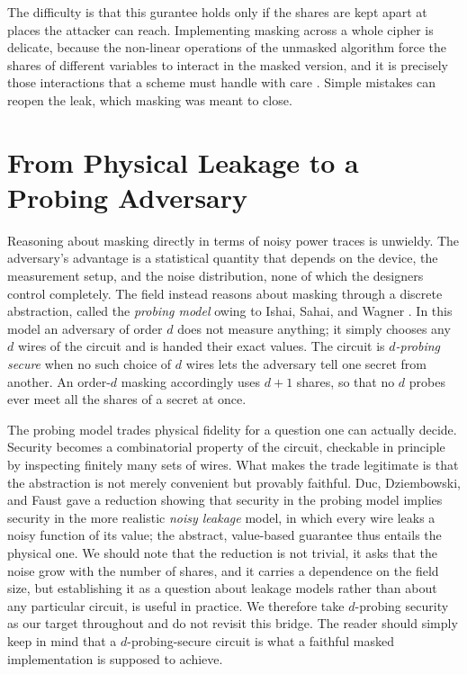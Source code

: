The difficulty is that this gurantee holds only if the shares are kept apart
at places the attacker can reach. Implementing masking across a whole cipher is
delicate, because the non-linear operations of the unmasked algorithm force the
shares of different variables to interact in the masked version, and it is precisely
those interactions that a scheme must handle with care \parencite{10.1007/978-3-540-45146-4_27,
rivain2010provably}. Simple mistakes can reopen the leak, which masking was meant to
close.

\section{From Physical Leakage to a Probing Adversary}
\label{sec:intro-model}

Reasoning about masking directly in terms of noisy power traces is unwieldy. The
adversary's advantage is a statistical quantity that depends on the device, the
measurement setup, and the noise distribution, none of which the designers
control completely. The field instead reasons about masking through a discrete abstraction,
called the \emph{probing model} owing to Ishai, Sahai, and Wagner
\parencite{10.1007/978-3-540-45146-4_27}. In this model an adversary of order $d$
does not measure anything; it simply chooses any $d$ wires of the circuit and is
handed their exact values. The circuit is
\emph{$d$-probing secure} when no such choice of $d$ wires lets the adversary tell
one secret from another. An order-$d$ masking accordingly uses $d+1$ shares, so
that no $d$ probes ever meet all the shares of a secret at once.

The probing model trades physical fidelity for a question one can actually decide.
Security becomes a combinatorial property of the circuit, checkable in principle by
inspecting finitely many sets of wires. What makes the trade legitimate is that the
abstraction is not merely convenient but provably faithful. Duc, Dziembowski, and
Faust \parencite{duc2014unifying} gave a reduction showing that security in the
probing model implies security in the more realistic \emph{noisy leakage} model, in
which every wire leaks a noisy function of its value; the abstract, value-based
guarantee thus entails the physical one. We should note that the reduction is not trivial,
it asks that the noise grow with the number of shares, and it carries a dependence on the field
size, but establishing it as a question about leakage models rather than about any
particular circuit, is useful in practice. We therefore take
$d$-probing security as our target throughout and do not revisit this bridge. The
reader should simply keep in mind that a $d$-probing-secure circuit is what a
faithful masked implementation is supposed to achieve.


